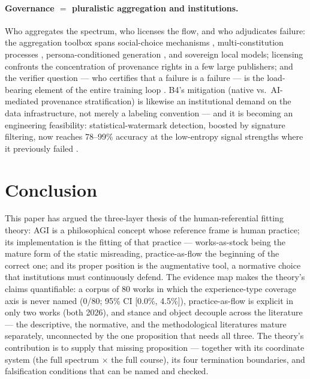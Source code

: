 \documentclass[10pt]{article}
\begin{document}
\paragraph{Governance $=$ pluralistic aggregation and institutions.}
Who aggregates the spectrum, who licenses the flow, and who adjudicates failure: the aggregation toolbox spans social-choice mechanisms \cite{park2024rlhf}, multi-constitution processes \cite{huang2024collective}, persona-conditioned generation \cite{ge2024scaling}, and sovereign local models; licensing confronts the concentration of provenance rights in a few large publishers; and the verifier question --- who certifies that a failure is a failure --- is the load-bearing element of the entire training loop \cite{yu2026failure, gharbi2026model}. B4's mitigation (native vs.\ AI-mediated provenance stratification) is likewise an institutional demand on the data infrastructure, not merely a labeling convention --- and it is becoming an engineering feasibility: statistical-watermark detection, boosted by signature filtering, now reaches 78--99\% accuracy at the low-entropy signal strengths where it previously failed \cite{hong2026signature}.

\section{Conclusion}\label{sec:conclusion}

This paper has argued the three-layer thesis of the human-referential fitting theory: AGI is a philosophical concept whose reference frame is human practice; its implementation is the fitting of that practice --- works-as-stock being the mature form of the static misreading, practice-as-flow the beginning of the correct one; and its proper position is the augmentative tool, a normative choice that institutions must continuously defend. The evidence map makes the theory's claims quantifiable: a corpus of 80 works in which the experience-type coverage axis is never named (0/80; 95\% CI [0.0\%, 4.5\%]), practice-as-flow is explicit in only two works (both 2026), and stance and object decouple across the literature --- the descriptive, the normative, and the methodological literatures mature separately, unconnected by the one proposition that needs all three. The theory's contribution is to supply that missing proposition --- together with its coordinate system (the full spectrum $\times$ the full course), its four termination boundaries, and falsification conditions that can be named and checked.
\end{document}

